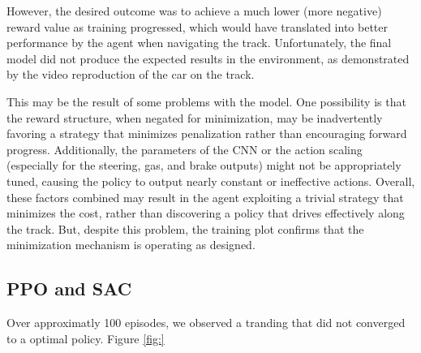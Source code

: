 \documentclass[../CSC_52081_EP.tex]{subfiles}
\begin{document}
However, the desired outcome was to achieve a much lower (more negative) reward value as training progressed, which would have translated into better performance by the agent when navigating the track. Unfortunately, the final model did not produce the expected results in the environment, as demonstrated by the video reproduction of the car on the track.

This may be the result of some problems with the model. One possibility is that the reward structure, when negated for minimization, may be inadvertently favoring a strategy that minimizes penalization rather than encouraging forward progress. Additionally, the parameters of the CNN or the action scaling (especially for the steering, gas, and brake outputs) might not be appropriately tuned, causing the policy to output nearly constant or ineffective actions. Overall, these factors combined may result in the agent exploiting a trivial strategy that minimizes the cost, rather than discovering a policy that drives effectively along the track. But, despite this problem, the training plot confirms that the minimization mechanism is operating as designed.

\subsection{PPO and SAC}

Over approximatly 100 episodes, we observed a tranding that did not converged to a optimal policy. Figure \ref{fig:}
\end{document}
